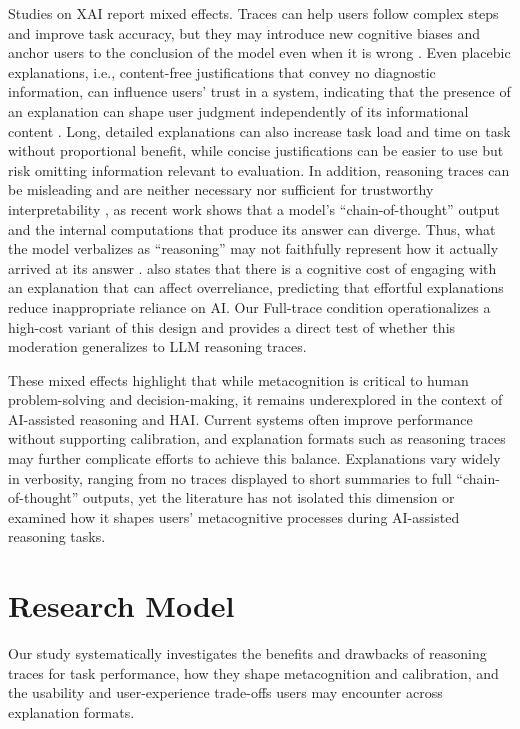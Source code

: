 \documentclass[manuscript, anonymous=false,authorversion,review=false]{acmart}
\begin{document}
Studies on XAI report mixed effects. Traces can help users follow complex steps and improve task accuracy, but they may introduce new cognitive biases \cite{bertrand2022cognitive} and anchor users to the conclusion of the model even when it is wrong \cite{10.1145/3397481.3450639}. Even placebic explanations, i.e., content-free justifications that convey no diagnostic information, can influence users' trust in a system, indicating that the presence of an explanation can shape user judgment independently of its informational content \cite{eiband2019impact}. Long, detailed explanations can also increase task load and time on task without proportional benefit, while concise justifications can be easier to use but risk omitting information relevant to evaluation.
In addition, reasoning traces can be misleading and are neither necessary nor sufficient for trustworthy interpretability \cite{barez2025chain}, as recent work shows that a model's ``chain-of-thought'' output and the internal computations that produce its answer can diverge. Thus, what the model verbalizes as ``reasoning'' may not faithfully represent how it actually arrived at its answer \cite{lindsey2025biology, 10.5555/3666122.3669397}.
\citet{vasconcelos2023explanations} also states that there is a cognitive cost of engaging with an explanation that can affect overreliance, predicting that effortful explanations reduce inappropriate reliance on AI. Our Full-trace condition operationalizes a high-cost variant of this design and provides a direct test of whether this moderation generalizes to LLM reasoning traces.

These mixed effects highlight that while metacognition is critical to human problem-solving and decision-making, it remains underexplored in the context of AI-assisted reasoning and HAI. Current systems often improve performance without supporting calibration, and explanation formats such as reasoning traces may further complicate efforts to achieve this balance. Explanations vary widely in verbosity, ranging from no traces displayed to short summaries to full ``chain-of-thought'' outputs, yet the literature has not isolated this dimension or examined how it shapes users' metacognitive processes during AI-assisted reasoning tasks.


\section{Research Model}

Our study systematically investigates the benefits and drawbacks of reasoning traces for task performance, how they shape metacognition and calibration, and the usability and user-experience trade-offs users may encounter across explanation formats.
\end{document}
